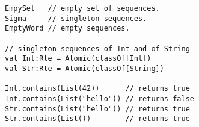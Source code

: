 \begin{lstlisting}[style=scalaioScala]
EmpySet   // empty set of sequences.
Sigma     // singleton sequences.
EmptyWord // empty sequences.

// singleton sequences of Int and of String
val Int:Rte = Atomic(classOf[Int])    
val Str:Rte = Atomic(classOf[String])

Int.contains(List(42))      // returns true
Int.contains(List("hello")) // returns false
Str.contains(List("hello")) // returns true
Str.contains(List())        // returns true
\end{lstlisting}
